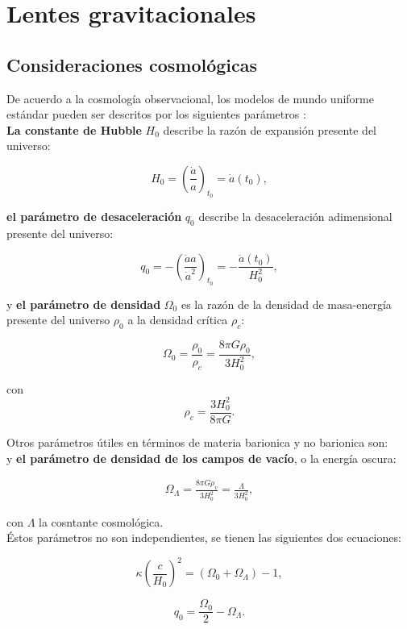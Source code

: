 \chapter{Lentes gravitacionales}

\section{Consideraciones cosmológicas}

De acuerdo a la cosmología observacional, los modelos de mundo uniforme estándar pueden ser descritos por los siguientes parámetros \cite{2008gafo.book.....L}:\\

\textbf{La constante de Hubble} $H_0$ describe la razón de expansión presente del universo:

$$ H_0 = \left( \frac{\dot{a}}{a} \right)_{t_0} = \dot{a}(t_0),$$

\textbf{el parámetro de desaceleración} $q_0$ describe la desaceleración adimensional presente del universo:

$$ q_0 = -\left( \frac{\ddot{a} a }{\dot{a}^2} \right)_{t_0} = -\frac{\ddot{a}(t_0)}{H_0^2}, $$

y \textbf{el parámetro de densidad} $\Omega_0$ es la razón de la densidad de masa-energía presente del universo $\rho_0$ a la densidad crítica $\rho_c$:

$$\Omega_0 = \frac{\rho_0}{\rho_c} = \frac{8\pi G\rho_0}{3H_0^2}, $$

con $$ \rho_c = \frac{3H_0^2}{8\pi G}. $$

Otros parámetros útiles en términos de materia barionica y no barionica son:\\

y \textbf{el parámetro de densidad de los campos de vacío}, o la energía oscura:

\begin{eqnarray}
\Omega_{\Lambda} = \frac{8\pi G \rho_v}{3 H_0^2} = \frac{\Lambda}{3H_0^2},
\end{eqnarray}

con $\Lambda$ la cosntante cosmológica.\\

Éstos parámetros no son independientes, se tienen las siguientes dos ecuaciones:

$$ \kappa \left( \frac{c}{H_0} \right)^2 = (\Omega_0 + \Omega_{\Lambda}) - 1, $$

$$ q_0 = \frac{\Omega_0}{2} - \Omega_{\Lambda}. $$


